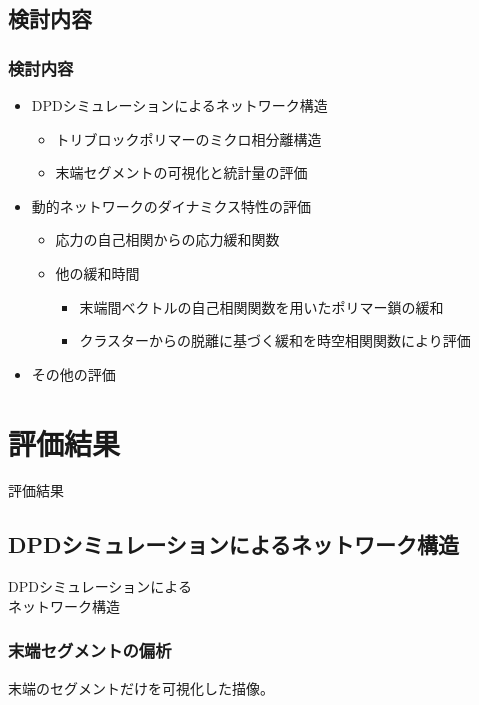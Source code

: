 \documentclass[12pt, dvipdfmx]{beamer}
\begin{document}
\begin{frame}
\begin{columns}[T, totalwidth=0.96\linewidth]
\end{columns}
\end{frame}

\subsection{検討内容}

\begin{frame}
\frametitle{検討内容}
\begin{itemize}
\item
DPDシミュレーションによるネットワーク構造
	\begin{itemize}
	\item
	トリブロックポリマーのミクロ相分離構造
	\item
	末端セグメントの可視化と統計量の評価
	\end{itemize}
\item
動的ネットワークのダイナミクス特性の評価
	\begin{itemize}
	\item
	応力の自己相関からの応力緩和関数
	\item
	他の緩和時間
		\begin{itemize}
		\item
		末端間ベクトルの自己相関関数を用いたポリマー鎖の緩和
		\item
		クラスターからの脱離に基づく緩和を時空相関関数により評価
		\end{itemize}
	\end{itemize}
\item
その他の評価
\end{itemize}
\end{frame}

\section{評価結果}
\begin{frame}
\LARGE{評価結果}
\end{frame}

\subsection{DPDシミュレーションによるネットワーク構造}
\begin{frame}
\LARGE{DPDシミュレーションによる\\ネットワーク構造}
\end{frame}
\begin{frame}
\frametitle{末端セグメントの偏析}

\centering
末端のセグメントだけを可視化した描像。
\vspace{3mm}


\end{frame}
\end{document}
